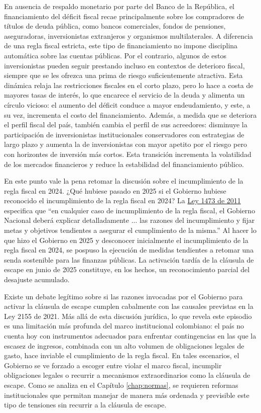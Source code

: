 En ausencia de respaldo monetario por parte del Banco de la República, el financiamiento del déficit fiscal recae principalmente sobre los compradores de títulos de deuda pública, como bancos comerciales, fondos de pensiones, aseguradoras, inversionistas extranjeros y organismos multilaterales. A diferencia de una regla fiscal estricta, este tipo de financiamiento no impone disciplina automática sobre las cuentas públicas. Por el contrario, algunos de estos inversionistas pueden seguir prestando incluso en contextos de deterioro fiscal, siempre que se les ofrezca una prima de riesgo suficientemente atractiva. Esta dinámica relaja las restricciones fiscales en el corto plazo, pero lo hace a costa de mayores tasas de interés, lo que encarece el servicio de la deuda y alimenta un círculo vicioso: el aumento del déficit conduce a mayor endeudamiento, y este, a su vez, incrementa el costo del financiamiento. Además, a medida que se deteriora el perfil fiscal del país, también cambia el perfil de sus acreedores: disminuye la participación de inversionistas institucionales conservadores con estrategias de largo plazo  y aumenta la de inversionistas con mayor apetito por el riesgo pero con horizontes de inversión más cortos. Esta transición incrementa la volatilidad de los mercados financieros y reduce la estabilidad del financiamiento público.

En este punto vale la pena retomar la discusión sobre el incumplimiento de la regla fiscal en 2024. ¿Qué hubiese pasado en 2025 si el Gobierno hubiese reconocido el incumplimiento de la regla fiscal en 2024? La \href{http://www.secretariasenado.gov.co/senado/basedoc/ley_1473_2011.html}{Ley 1473 de 2011} especifica que ``en cualquier caso de incumplimiento de la regla fiscal, el Gobierno Nacional deberá explicar detalladamente ... las razones del incumplimiento y fijar metas y objetivos tendientes a asegurar el cumplimiento de la misma.'' Al hacer lo que hizo el Gobierno en 2025 y desconocer inicialmente el incumplimiento de la regla fiscal en 2024, se pospuso la ejecución de medidas tendientes a retomar una senda sostenible para las finanzas públicas. La activación tardía de la cláusula de escape en junio de 2025 constituye, en los hechos, un reconocimiento parcial del desajuste acumulado.

Existe un debate legítimo sobre si las razones invocadas por el Gobierno para activar la cláusula de escape cumplen cabalmente con las causales previstas en la Ley 2155 de 2021. Más allá de esta discusión jurídica, lo que revela este episodio es una limitación más profunda del marco institucional colombiano: el país no cuenta hoy con instrumentos adecuados para enfrentar contingencias en las que la escasez de ingresos, combinada con un alto volumen de obligaciones legales de gasto, hace inviable el cumplimiento de la regla fiscal. En tales escenarios, el Gobierno se ve forzado a escoger entre violar el marco fiscal, incumplir obligaciones legales o recurrir a mecanismos extraordinarios como la cláusula de escape. Como se analiza en el Capítulo \ref{chap:normas}, se requieren reformas institucionales que permitan manejar de manera más ordenada y previsible este tipo de tensiones sin recurrir a la cláusula de escape.

